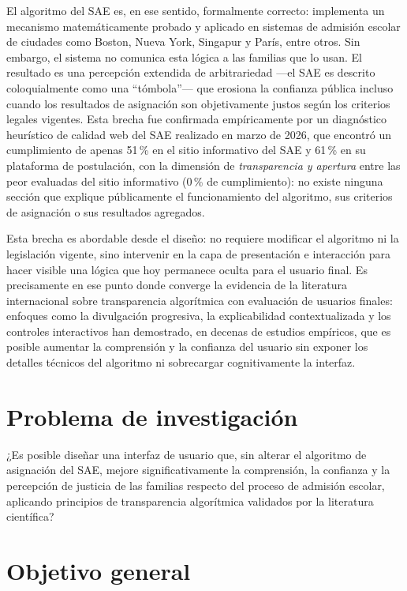 El algoritmo del SAE es, en ese sentido, formalmente correcto: implementa un mecanismo matemáticamente probado y aplicado en sistemas de admisión escolar de ciudades como Boston, Nueva York, Singapur y París, entre otros. Sin embargo, el sistema no comunica esta lógica a las familias que lo usan. El resultado es una percepción extendida de arbitrariedad —el SAE es descrito coloquialmente como una ``tómbola''— que erosiona la confianza pública incluso cuando los resultados de asignación son objetivamente justos según los criterios legales vigentes. Esta brecha fue confirmada empíricamente por un diagnóstico heurístico de calidad web del SAE realizado en marzo de 2026, que encontró un cumplimiento de apenas 51\,\% en el sitio informativo del SAE y 61\,\% en su plataforma de postulación, con la dimensión de \emph{transparencia y apertura} entre las peor evaluadas del sitio informativo (0\,\% de cumplimiento): no existe ninguna sección que explique públicamente el funcionamiento del algoritmo, sus criterios de asignación o sus resultados agregados.

Esta brecha es abordable desde el diseño: no requiere modificar el algoritmo ni la legislación vigente, sino intervenir en la capa de presentación e interacción para hacer visible una lógica que hoy permanece oculta para el usuario final. Es precisamente en ese punto donde converge la evidencia de la literatura internacional sobre transparencia algorítmica con evaluación de usuarios finales: enfoques como la divulgación progresiva, la explicabilidad contextualizada y los controles interactivos han demostrado, en decenas de estudios empíricos, que es posible aumentar la comprensión y la confianza del usuario sin exponer los detalles técnicos del algoritmo ni sobrecargar cognitivamente la interfaz.

\section*{Problema de investigación}

¿Es posible diseñar una interfaz de usuario que, sin alterar el algoritmo de asignación del SAE, mejore significativamente la comprensión, la confianza y la percepción de justicia de las familias respecto del proceso de admisión escolar, aplicando principios de transparencia algorítmica validados por la literatura científica?

\section*{Objetivo general}

